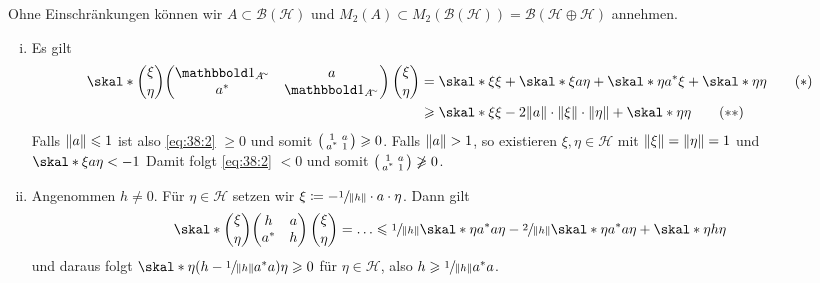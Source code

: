 \begin{beweis}
	Ohne Einschränkungen können wir $A \subset \mathcal{B}(\mathcal{H})$ und $M_2(A) \subset M_2(\mathcal{B}(\mathcal{H})) = \mathcal{B}(\mathcal{H} \oplus \mathcal{H})$ annehmen.
	\begin{enumerate}[(i)]
		\item Es gilt
		\begin{align}
			\skal*{\binom{\xi}{\eta}}{ \begin{pmatrix}
				\ind_{A^\simm} & a \\
				a^* & \ind_{A^\simm}
			\end{pmatrix} \binom{\xi}{\eta}} &= \skal*{\xi}{\xi} + \skal*{\xi}{a \eta} + \skal*{\eta}{a^* \xi} + \skal*{\eta}{\eta} \label{eq:38:1} \tag{$*$}\\
			&\ge \skal*{\xi}{\xi} - 2 \norm*{a} \cdot \norm*{\xi} \cdot \norm*{\eta} + \skal*{\eta}{\eta} \label{eq:38:2} \tag{$**$}
		\end{align}
		Falls $\norm*{a} \le 1$ ist also \eqref{eq:38:2} $\ge 0$ und somit $\begin{psmallmatrix}
			1 & a \\ a^* & 1
		\end{psmallmatrix} \ge 0$.
		Falls $\norm*{a} > 1$, so existieren $\xi,\eta \in \mathcal{H}$ mit $\norm*{\xi} = \norm*{\eta}=1$ und $\skal*{\xi}{a \eta} < -1$
		Damit folgt \eqref{eq:38:2} $<0$ und somit $\begin{psmallmatrix}
			1 & a \\ a^* & 1
		\end{psmallmatrix} \not\ge 0$.
		\item Angenommen $h \neq 0$. Für $\eta \in \mathcal{H}$ setzen wir $\xi \coloneqq - \sfrac{1}{\norm*{h}} \cdot a \cdot \eta$.
		Dann gilt
		\[
			\skal*{\binom{\xi}{\eta}}{\begin{pmatrix}
				h & a \\ a^* & h
			\end{pmatrix} \binom{\xi}{\eta}} = \ldots \le \sfrac{1}{\norm*{h}} \skal*{\eta}{a^* a \eta} - \sfrac{2}{\norm*{h}} \skal*{\eta}{a^* a \eta} + \skal*{\eta}{h \eta}
		\]
		und daraus folgt $\skal*{\eta}{ \enbrace*{h - \sfrac{1}{\norm*{h}} a^*a}\eta} \ge 0$ für $\eta \in \mathcal{H}$, also $h \ge \sfrac{1}{\norm*{h}} a^* a$.
	\end{enumerate}
\end{beweis}

